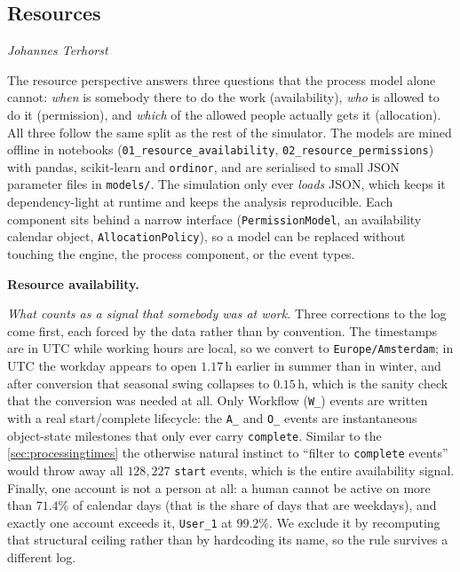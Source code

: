 %
%

\subsection{Resources}

\textit{Johannes Terhorst}

The resource perspective answers three questions that the process model alone
cannot: \emph{when} is somebody there to do the work (availability), \emph{who}
is allowed to do it (permission), and \emph{which} of the allowed people
actually gets it (allocation). All three follow the same split as the rest of
the simulator. The models are mined offline in notebooks
(\texttt{01\_resource\_availability}, \texttt{02\_resource\_permissions}) with
pandas, scikit-learn and \texttt{ordinor}, and are serialised to small JSON
parameter files in \texttt{models/}. The simulation only ever \emph{loads}
JSON, which keeps it dependency-light at runtime and keeps the analysis
reproducible. Each component sits behind a narrow interface
(\texttt{PermissionModel}, an availability calendar object,
\texttt{AllocationPolicy}), so a model can be replaced without touching the
engine, the process component, or the event types.

\textbf{Resource availability.}

\emph{What counts as a signal that somebody was at work.} Three corrections to
the log come first, each forced by the data rather than by convention. The
timestamps are in UTC while working hours are local, so we convert to
\texttt{Europe/Amsterdam}; in UTC the workday appears to open $1.17$\,h earlier
in summer than in winter, and after conversion that seasonal swing collapses to
$0.15$\,h, which is the sanity check that the conversion was needed at all.
Only Workflow (\texttt{W\_}) events are written with a real start/complete
lifecycle: the \texttt{A\_} and \texttt{O\_} events are instantaneous
object-state milestones that only ever carry \texttt{complete}. Similar to the \ref{sec:processingtimes} the otherwise natural instinct to ``filter to \texttt{complete} events'' would
throw away all $128{,}227$ \texttt{start} events, which is the entire
availability signal. Finally, one account is not a person at all: a human
cannot be active on more than $71.4\%$ of calendar days (that is the share of
days that are weekdays), and exactly one account exceeds it, \texttt{User\_1}
at $99.2\%$. We exclude it by recomputing that structural ceiling rather than
by hardcoding its name, so the rule survives a different log.


